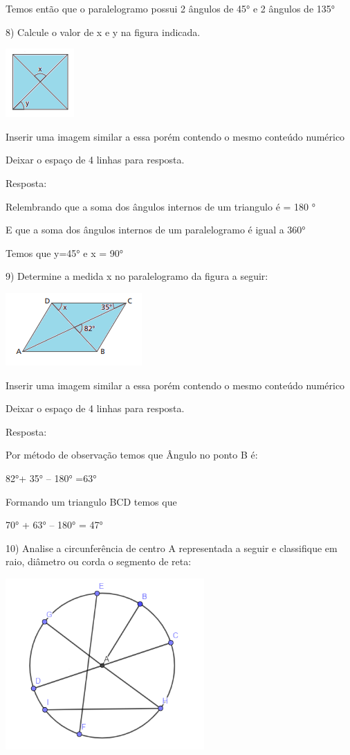Temos então que o paralelogramo possui 2 ângulos de 45° e 2 ângulos de
135°

8) Calcule o valor de x e y na figura indicada.

\includegraphics[width=1.03125in,height=1.03125in]{./imgSAEB_8_MAT/media/image10.png}

Inserir uma imagem similar a essa porém contendo o mesmo conteúdo
numérico

Deixar o espaço de 4 linhas para resposta.

Resposta:

Relembrando que a soma dos ângulos internos de um triangulo é = 180 °

E que a soma dos ângulos internos de um paralelogramo é igual a 360°

Temos que y=45° e x = 90°

9) Determine a medida x no paralelogramo da figura a seguir:

\includegraphics[width=2.05208in,height=1.09375in]{./imgSAEB_8_MAT/media/image11.png}

Inserir uma imagem similar a essa porém contendo o mesmo conteúdo
numérico

Deixar o espaço de 4 linhas para resposta.

Resposta:

Por método de observação temos que Ângulo no ponto B é:

82°+ 35° -- 180° =63°

Formando um triangulo BCD temos que

70° + 63° -- 180° = 47°

10) Analise a circunferência de centro A representada a seguir e
classifique em raio, diâmetro ou corda o segmento de reta:

\includegraphics[width=2.98681in,height=2.57292in]{./imgSAEB_8_MAT/media/image12.png}

